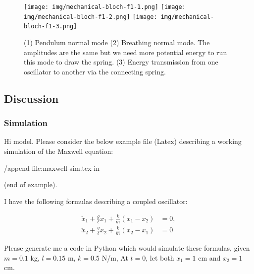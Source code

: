 \begin{figure}[H]
  \centering
  \texttt{[image: img/mechanical-bloch-f1-1.png]}
  \texttt{[image: img/mechanical-bloch-f1-2.png]}
  \texttt{[image: img/mechanical-bloch-f1-3.png]}
  \caption{(1) Pendulum normal mode (2) Breathing normal mode. The amplitudes are the same but we
  need more potential energy to run this mode to draw the spring. (3) Energy transmission from one
  oscillator to another via the connecting spring.}
  \label{fig:mechanical-bloch}
\end{figure}


\subsection{Discussion}

\subsubsection{Simulation}
\begin{ai}

Hi model. Please consider the below example file (Latex) describing a working simulation of the
Maxwell equation:

/append file:maxwell-sim.tex in

(end of example).

I have the following formulas describing a coupled oscillator:

\[
\begin{aligned}
  \ddot{x}_1 + \frac{g}{\ell} x_1 + \frac{k}{m} (x_1 - x_2) &= 0, \\
  \ddot{x}_2 + \frac{g}{\ell} x_2 + \frac{k}{m} (x_2 - x_1) &= 0
\end{aligned}
\]

Please generate me a code in Python which would simulate these formulas, given $m=0.1$ kg, $l=0.15
$ m, $k = 0.5$ N/m, At $t=0$, let both $x_1 = 1$ cm and $x_2 = 1$ cm.

\end{ai}

